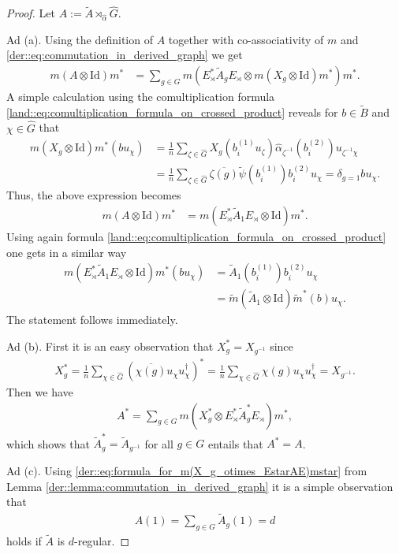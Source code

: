 \documentclass{amsart}
\theoremstyle{definition}
\theoremstyle{definition}
\begin{document}
\begin{proof}
    Let $A := \tilde{A} \rtimes_{\hat{\alpha}} \hat{G}$.

    Ad (a). Using the definition of $A$ together with co-associativity of $m$ and \eqref{der::eq:commutation_in_derived_graph} we get
    \begin{align*}
        m(A \otimes \mathrm{Id}) m^\ast
            &= \sum_{g \in G} m(E_\rtimes^\ast \tilde{A}_g E_\rtimes \otimes m(X_g \otimes \mathrm{Id})m^\ast) m^\ast.
    \end{align*}
    A simple calculation using the comultiplication formula \eqref{land::eq:comultiplication_formula_on_crossed_product} reveals for $b \in \tilde{B}$ and $\chi \in \hat{G}$ that
    \begin{align*}
        m(X_g \otimes \mathrm{Id}) m^\ast(b u_\chi)
            &= \frac{1}{n} \sum_{\zeta \in \hat{G}} X_g(b_i^{(1)} u_\zeta) \hat{\alpha}_{\zeta^{-1}}(b_i^{(2)}) u_{\zeta^{-1} \chi} \\
            &= \frac{1}{n} \sum_{\zeta \in \hat{G}} \overline{\zeta(g)} \tilde{\psi}(b_i^{(1)}) b_i^{(2)} u_{\chi} 
            = \delta_{g=1} b u_\chi.
    \end{align*}
    Thus, the above expression becomes
    \begin{align*}
        m(A \otimes \mathrm{Id}) m^\ast
            &= m(E_\rtimes^\ast \tilde{A}_1 E_\rtimes \otimes \mathrm{Id}) m^\ast.
    \end{align*}
    Using again formula \eqref{land::eq:comultiplication_formula_on_crossed_product} one gets in a similar way
    \begin{align*}
        m(E_\rtimes^\ast \tilde{A}_1 E_\rtimes \otimes \mathrm{Id}) m^\ast(b u_\chi)
            &= \tilde{A}_1(b_i^{(1)}) b_i^{(2)} u_\chi \\
            &= \tilde{m}(\tilde{A}_1 \otimes \mathrm{Id}) \tilde{m}^\ast(b) u_\chi.
    \end{align*}
    The statement follows immediately.

    Ad (b). First it is an easy observation that $X_g^\ast = X_{g^{-1}}$ since
    \begin{align*}
        X_g^\ast = \frac{1}{n} \sum_{\chi \in \hat{G}} (\overline{\chi(g)} u_\chi u_\chi^\dagger)^\ast
            = \frac{1}{n} \sum_{\chi \in \hat{G}} \chi(g) u_\chi u_\chi^\dagger
            = X_{g^{-1}}.
    \end{align*}
    Then we have
    \begin{align*}
        A^\ast = \sum_{g \in G} m(X_g^\ast \otimes E_\rtimes^\ast \tilde{A}_g^\ast E_\rtimes) m^\ast,
    \end{align*}
    which shows that $\tilde{A}_g^\ast = \tilde{A}_{g^{-1}}$ for all $g \in G$ entails that $A^\ast = A$.

    Ad (c). Using \eqref{der::eq:formula_for_m(X_g_otimes_EstarAE)mstar} from Lemma \ref{der::lemma:commutation_in_derived_graph} it is a simple observation that
    \begin{align*}
        A(1) = \sum_{g \in G} \tilde{A}_g(1) = d
    \end{align*}
    holds if $\tilde{A}$ is $d$-regular.
\end{proof}
\end{document}

